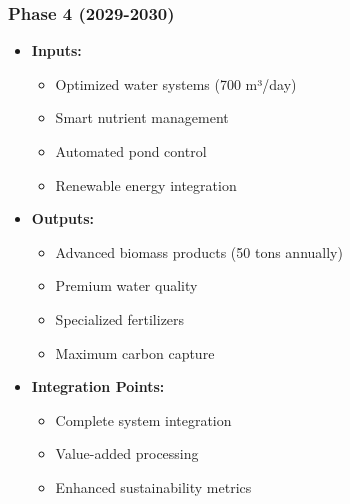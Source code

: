 \subsubsection{Phase 4 (2029-2030)}
\begin{itemize}
    \item \textbf{Inputs:}
    \begin{itemize}
        \item Optimized water systems (700 m³/day)
        \item Smart nutrient management
        \item Automated pond control
        \item Renewable energy integration
    \end{itemize}
    \item \textbf{Outputs:}
    \begin{itemize}
        \item Advanced biomass products (50 tons annually)
        \item Premium water quality
        \item Specialized fertilizers
        \item Maximum carbon capture
    \end{itemize}
    \item \textbf{Integration Points:}
    \begin{itemize}
        \item Complete system integration
        \item Value-added processing
        \item Enhanced sustainability metrics
    \end{itemize}
\end{itemize}

